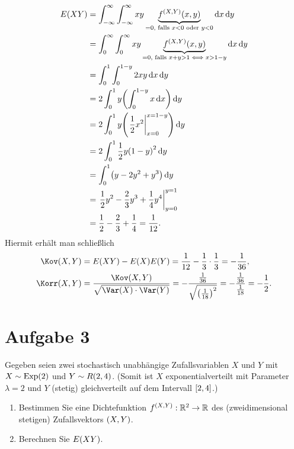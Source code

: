 \documentclass{exercise}
\begin{document}
\begin{enumerate}
        \begin{align*}
            E\parentheses*{XY} &= \int_{-\infty}^\infty \int_{-\infty}^\infty xy\underbrace{f^{\parentheses*{X, Y}}\parentheses*{x, y}}_{= 0\text{, falls }x < 0\text{ oder }y < 0}\d x\d y\\
            &= \int_0^\infty \int_0^\infty xy\underbrace{f^{\parentheses*{X, Y}}\parentheses*{x, y}}_{= 0\text{, falls }x + y > 1 \iff x > 1 - y}\d x\d y\\
            &= \int_0^1 \int_0^{1 - y}2xy\d x\d y\\
            &= 2\int_0^1 y\parentheses*{\int_0^{1 - y}x\d x}\d y\\
            &= 2\int_0^1 y\parentheses*{\left.\frac{1}{2}x^2\right|_{x = 0}^{x = 1 - y}}\d y\\
            &= 2\int_0^1 \frac{1}{2}y\parentheses*{1 - y}^2 \d y\\
            &= \int_0^1\parentheses*{y - 2y^2 + y^3}\d y\\
            &= \left.\frac{1}{2}y^2 - \frac{2}{3}y^3 + \frac{1}{4}y^4\right|_{y = 0}^{y = 1}\\
            &= \frac{1}{2} - \frac{2}{3} + \frac{1}{4} = \frac{1}{12}.
        \end{align*}
        Hiermit erhält man schließlich
        \begin{align*}
            \Kov\parentheses*{X, Y} &= E\parentheses*{XY} - E\parentheses*{X}E\parentheses*{Y} = \frac{1}{12} - \frac{1}{3} \cdot \frac{1}{3} = -\frac{1}{36},\\
            \Korr\parentheses*{X, Y} &= \frac{\Kov\parentheses*{X, Y}}{\sqrt{\Var\parentheses*{X} \cdot \Var\parentheses*{Y}}} = -\frac{\frac{1}{36}}{\sqrt{\parentheses*{\frac{1}{18}}^2}} = -\frac{\frac{1}{36}}{\frac{1}{18}} = -\frac{1}{2}.
        \end{align*}
    \end{enumerate}
    
    
    \section*{Aufgabe 3}
    
    \begin{problem}
        Gegeben seien zwei stochastisch unabhängige Zufallsvariablen \(X\) und \(Y\) mit \(X \sim \Exp\parentheses*{2}\) und \(Y \sim R\parentheses*{2, 4}\).
        (Somit ist \(X\) exponentialverteilt mit Parameter \(\lambda = 2\) und \(Y\) (stetig) gleichverteilt auf dem Intervall \(\brackets*{2, 4}\).)
        \begin{enumerate}
            \item Bestimmen Sie eine Dichtefunktion \(f^{\parentheses*{X, Y}}: \R^2 \to \R\) des (zweidimensional stetigen) Zufallsvektors \(\parentheses*{X, Y}\).
            \item Berechnen Sie \(E\parentheses*{XY}\).
        \end{enumerate}
    \end{problem}
    
\end{document}
